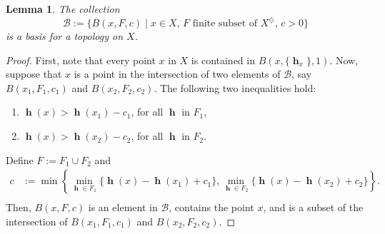 \documentclass[10pt,a4paper]{amsart}
\newtheorem{lemma}[theorem]{Lemma}
\DeclareMathOperator{\h}{\mathbf{h}} %
\begin{document}
\begin{lemma}
The collection 
$$
\mathscr{B}:= \{ B(x,F,c) \mid x\in X,\, 
F \text{ finite subset of }X^\diamondsuit,\, c > 0\}
$$
is a basis for a topology on $X$.
\end{lemma}

\begin{proof}
First, note that every point $x$ in $X$ is contained in 
$B(x,\{\h_x\},1)$.
Now, suppose that $x$ is a point in the intersection
of two elements of $\mathscr{B}$, say $B(x_1,F_1,c_1)$ 
and $B(x_2,F_2,c_2)$. The following two inequalities hold:
\begin{enumerate}
    \item $\h(x) > \h(x_1) - c_1$, for all $\h$ in $F_1$,
    \item $\h(x) > \h(x_2) - c_2$, for all $\h$ in $F_2$.
\end{enumerate}
Define $F:=F_1 \cup F_2$ and
\begin{align*}
    c &:= \min\left\{\min_{\h\in F_1}\{\h(x)-\h(x_1)+c_1\}, 
    \min_{\h\in F_2}\{\h(x)-\h(x_2)+c_2\}\right\}. \\
\end{align*}
Then, $B(x,F,c)$ is an element in $\mathscr{B}$, contains
the point $x$, and is a subset of the intersection of 
$B(x_1,F_1,c_1)$ and $B(x_2,F_2,c_2)$.
\end{proof}
\end{document}
